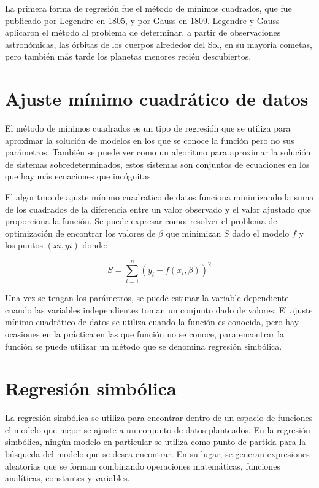 La primera forma de regresión fue el método de mínimos cuadrados, que fue publicado por Legendre en 1805, y por Gauss en 1809. Legendre y Gauss aplicaron el método al problema de determinar, a partir de observaciones astronómicas, las órbitas de los cuerpos alrededor del Sol, en su mayoría cometas, pero también más tarde los planetas menores recién descubiertos.

\section{Ajuste mínimo cuadrático de datos}

El método de mínimos cuadrados es un tipo de regresión que se utiliza para aproximar la solución de modelos en los que se conoce la función pero no sus parámetros. También se puede ver como un algoritmo para aproximar la solución de sistemas sobredeterminados, estos sistemas son conjuntos de ecuaciones en los que hay más ecuaciones que incógnitas.

El algoritmo de ajuste mínimo cuadratico de datos funciona minimizando la suma de los cuadrados de la diferencia entre un valor observado y el valor ajustado que proporciona la función. Se puede expresar como: resolver el problema de optimización de encontrar los valores de $\beta$ que minimizan $S$ dado el modelo $f$ y los puntos $(xi, yi)$ donde:

$$S = \sum_{i=1}^{n}(y_i - f(x_i, \beta))^2$$

Una vez se tengan los parámetros, se puede estimar la variable dependiente cuando las variables independientes toman un conjunto dado de valores. El ajuste mínimo cuadrático de datos se utiliza cuando la función es conocida, pero hay ocasiones en la práctica en las que función no se conoce, para encontrar la función se puede utilizar un método que se denomina regresión simbólica.

\section{Regresión simbólica}

La regresión simbólica se utiliza para encontrar dentro de un espacio de funciones el modelo que mejor se ajuste a un conjunto de datos planteados. En la regresión simbólica, ningún modelo en particular se utiliza como punto de partida para la búsqueda del modelo que se desea encontrar. En su lugar, se generan expresiones aleatorias que se forman combinando operaciones matemáticas, funciones analíticas, constantes y variables.

